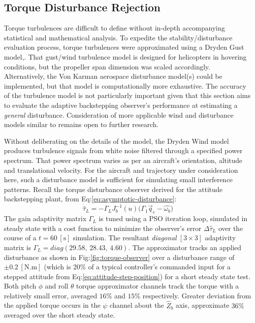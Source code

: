 \subsection{Torque Disturbance Rejection}
\label{subsec:simulation.disturbance.torque}
Torque turbulences are difficult to define without in-depth accompanying statistical and mathematical analysis. To expedite the stability/disturbance evaluation process, torque turbulences were approximated using a Dryden Gust model,\cite{optimalgust,discretegustmodel}. That gust/wind turbulence model is designed for helicopters in hovering conditions, but the propeller span dimension was scaled accordingly. Alternatively, the Von Karman aerospace disturbance model(s) could be implemented, but that model is computationally more exhaustive. The accuracy of the turbulence model is not particularly important given that this section aims to evaluate the adaptive backstepping observer's performance at estimating a \emph{general} disturbance. Consideration of more applicable wind and disturbance models similar to \cite{nonlineardynamics} remains open to further research.
\par
Without deliberating on the details of the model, the Dryden Wind model produces turbulence signals from white noise filtered through a specified power spectrum. That power spectrum varies as per an aircraft's orientation, altitude and translational velocity. For the aircraft and trajectory under consideration here, such a disturbance model is sufficient for simulating small interference patterns. Recall the torque disturbance observer derived for the attitude backstepping plant, from Eq:\ref{eq:asymptotic-disturbance}:
\begin{equation}\label{eq:stability-torque-overserver}
\dot{\hat{\tau}}_L=-\Gamma_L J_b^{-1}(u)\big(\Gamma_1\vec{q}_e-\hat{\omega_b}\big)
\end{equation}
The gain adaptivity matrix $\Gamma_L$ is tuned using a PSO iteration loop, simulated in steady state with a cost function to minimize the observer's error $\Delta\hat{\tau}_L$ over the course of a $t=60~[\text{s}]$ simulation. The resultant \emph{diagonal} $[3\times 3]$ adaptivity matrix is $\Gamma_L=diag(29.58,~28.43,~4.60)$. The approximator tracks an applied disturbance as shown in Fig:\ref{fig:torque-observer} over a disturbance range of $\pm 0.2~[\text{N.m}]$ (which is 20\% of a typical controller's commanded input for a stepped attitude from Eq:\ref{eq:attitude-step-position}) for a short steady state test. Both pitch $\phi$ and roll $\theta$ torque approximator channels track the torque with a relatively small error, averaged $16\%$ and $15\%$ respectively. Greater deviation from the applied torque occurs in the $\psi$ channel about the $\hat{Z}_b$ axis, approximate $36\%$ averaged over the short steady state.
